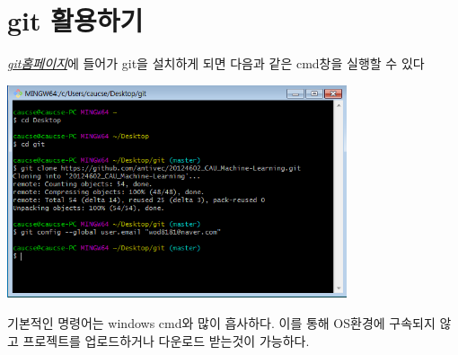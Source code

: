 \documentclass[12pt]{article}
\begin{document}
\section{git 활용하기}
	\textit{\href{https://git-scm.com/download/win}{git홈페이지}}에 들어가 git을 설치하게 되면 다음과 같은 cmd창을 실행할 수 있다

	\includegraphics[width=0.75\textwidth]{git_cmd}
	
	기본적인 명령어는 windows cmd와 많이 흡사하다.
	이를 통해 OS환경에 구속되지 않고 프로젝트를 업로드하거나 다운로드 받는것이 가능하다.

		
		
		
\end{document}
